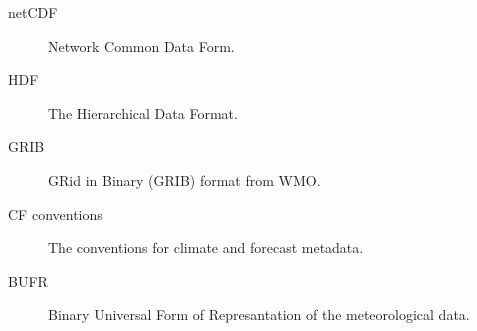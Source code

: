 
%
% 
%
%
%



\begin{description}

\item [netCDF] \label{netCDF} Network Common Data Form.

\item [HDF] \label{HDF}  The Hierarchical Data Format.
\item [GRIB] \label{GRIB}  GRid in Binary (GRIB) format from
WMO. 
\item [CF conventions] \label{CF_conv} The conventions for climate
and forecast metadata.
\item [BUFR] \label{BUFR} Binary Universal Form of Represantation
of the meteorological data.
\end{description}







